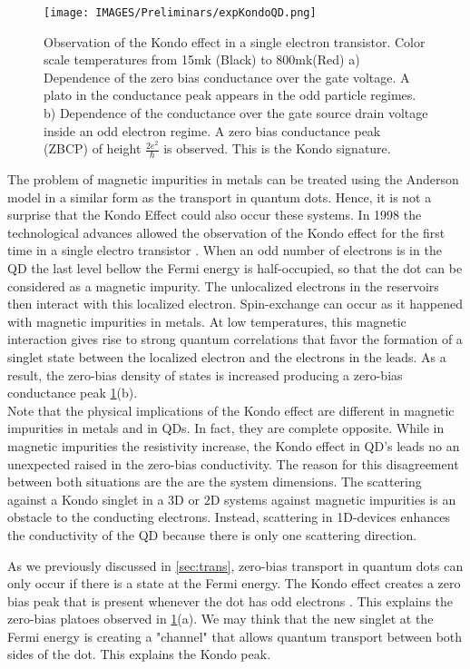 \begin{figure}
  \centering
  \texttt{[image: IMAGES/Preliminars/expKondoQD.png]}
  \caption{ \label{fig:ExpKondo} Observation of the Kondo effect in a single electron transistor. Color scale temperatures from 15mk (Black) to 800mk(Red) a) Dependence of the zero bias conductance over the gate voltage. A plato in the conductance peak appears in the odd particle regimes. b) Dependence of the conductance over the gate source drain voltage inside an odd electron regime. A zero bias conductance peak (ZBCP)  of height $\frac{2e^2}{\hbar}$ is observed. This is the Kondo signature.  \protect{}}
\end{figure}


  The problem of magnetic impurities in metals can be treated using the Anderson model in a similar form as the transport in quantum dots. Hence, it is not a surprise that the Kondo Effect could also occur these systems. In 1998 the technological advances allowed the observation of the Kondo effect for the first time in a single electro transistor \cite{goldhaber-gordon_kondo_1998}. When an odd number of electrons is in the QD the last level bellow the Fermi energy is half-occupied, so that the dot can be considered as a magnetic impurity. The unlocalized electrons in the reservoirs then interact with this localized electron. Spin-exchange can occur as it happened with  magnetic impurities in metals. At low temperatures, this magnetic  interaction gives rise to strong quantum correlations that favor the formation of a singlet state between the localized electron and the electrons in the leads. As a result, the zero-bias density of states is increased producing a zero-bias conductance peak \ref{fig:ExpKondo}(b). \\

Note that the physical implications of the Kondo effect  are different in magnetic impurities in metals and in QDs. In fact, they are complete opposite. While in magnetic impurities the resistivity increase, the Kondo effect in QD's leads no an unexpected raised in the zero-bias conductivity. The reason for this disagreement between both situations are the are the system dimensions. The scattering against a Kondo singlet in a  $3$D or $2$D systems against magnetic impurities is an obstacle to the conducting electrons. Instead, scattering in 1D-devices enhances the conductivity of the QD because there is only one scattering direction.

 As we previously discussed in \ref{sec:trans}, zero-bias transport in quantum dots can only occur if there is a state at the Fermi energy.  The Kondo effect creates a zero bias peak that is present whenever the dot has odd electrons . This explains the zero-bias platoes observed in \ref{fig:ExpKondo}(a). We may think that the new singlet at the Fermi energy is creating a "channel" that allows quantum transport between both sides of the dot. This explains the Kondo peak. 

